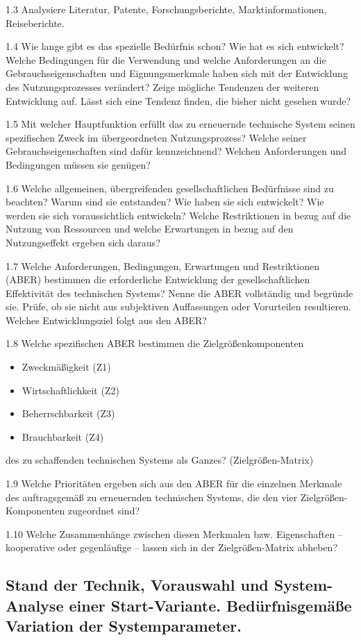 \documentclass[12pt,a4paper]{article}
\begin{document}
1.3 Analysiere Literatur, Patente, Forschungsberichte, Marktinformationen,
Reiseberichte.

1.4 Wie lange gibt es das spezielle Bedürfnis schon? Wie hat es sich
entwickelt? Welche Bedingungen für die Verwendung und welche Anforderungen an
die Gebrauchseigenschaften und Eignungsmerkmale haben sich mit der Entwicklung
des Nutzungsprozesses verändert? Zeige mögliche Tendenzen der weiteren
Entwicklung auf. Lässt sich eine Tendenz finden, die bisher nicht gesehen
wurde?

1.5 Mit welcher Hauptfunktion erfüllt das zu erneuernde technische System
seinen spezifischen Zweck im übergeordneten Nutzungsprozess? Welche seiner
Gebrauchseigenschaften sind dafür kennzeichnend? Welchen Anforderungen und
Bedingungen müssen sie genügen?

1.6 Welche allgemeinen, übergreifenden gesellschaftlichen Bedürfnisse sind zu
beachten? Warum sind sie entstanden? Wie haben sie sich entwickelt? Wie werden
sie sich voraussichtlich entwickeln? Welche Restriktionen in bezug auf die
Nutzung von Ressourcen und welche Erwartungen in bezug auf den Nutzungseffekt
ergeben sich daraus?

1.7 Welche Anforderungen, Bedingungen, Erwartungen und Restriktionen (ABER)
bestimmen die erforderliche Entwicklung der gesellschaftlichen Effektivität des
technischen Systems? Nenne die ABER vollständig und begründe sie. Prüfe, ob sie
nicht aus subjektiven Auffassungen oder Vorurteilen resultieren. Welches
Entwicklungsziel folgt aus den ABER?

1.8  Welche spezifischen ABER bestimmen die Zielgrößenkomponenten 
\begin{itemize}
  \item Zweckmäßigkeit (Z1)
  \item Wirtschaftlichkeit (Z2)
  \item Beherrschbarkeit (Z3)
  \item Brauchbarkeit (Z4)
\end{itemize}
des zu schaffenden technischen Systems als Ganzes? (Zielgrößen-Matrix)

1.9 Welche Prioritäten ergeben sich aus den ABER für die einzelnen Merkmale des
auftragsgemäß zu erneuernden technischen Systems, die den vier
Zielgrößen-Komponenten zugeordnet sind?

1.10 Welche Zusammenhänge zwischen diesen Merkmalen bzw. Eigenschaften –
kooperative oder gegenläufige – lassen sich in der Zielgrößen-Matrix abheben?

\subsection{Stand der Technik, Vorauswahl und System-Analyse einer
  Start-Variante.  Bedürfnisgemäße Variation der Systemparameter.}
\end{document}
